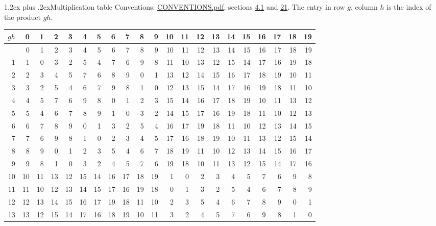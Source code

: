 \documentclass[10pt,a4paper]{article}
\makeatletter
\renewcommand\section{\@startsection{section}{1}{\z@}{-3ex plus -1ex minus -.2ex}%
  {1.2ex plus .2ex}{\normalfont\large\sffamily\bfseries\color{parttitle}}}
\numberwithin{equation}{section}
\makeatother
\begin{document}
\section{Multiplication table}\label{s:multiplication}
Conventions: \href{../../CONVENTIONS.pdf}{CONVENTIONS.pdf}, sections \href{../../../rotation/CONVENTIONS.pdf\#conv.4.1}{4.1} and \href{../../CONVENTIONS.pdf\#conv.21}{21}.
The entry in row $g$, column $h$ is the index of the product $gh$.
{\normalsize\setlength{\tabcolsep}{0.1em}\setlength{\LTleft}{-8pt plus 1fill}\setlength{\LTright}{-8pt plus 1fill}\begin{longtable}{@{}r|rrrrrrrrrrrrrrrrrrrr@{}}\toprule
$gh$ & 0 & 1 & 2 & 3 & 4 & 5 & 6 & 7 & 8 & 9 & 10 & 11 & 12 & 13 & 14 & 15 & 16 & 17 & 18 & 19\\\midrule\endhead
\bottomrule\endfoot\endlastfoot
0 & 0 & 1 & 2 & 3 & 4 & 5 & 6 & 7 & 8 & 9 & 10 & 11 & 12 & 13 & 14 & 15 & 16 & 17 & 18 & 19\\*
1 & 1 & 0 & 3 & 2 & 5 & 4 & 7 & 6 & 9 & 8 & 11 & 10 & 13 & 12 & 15 & 14 & 17 & 16 & 19 & 18\\
2 & 2 & 3 & 4 & 5 & 7 & 6 & 8 & 9 & 0 & 1 & 13 & 12 & 14 & 15 & 16 & 17 & 18 & 19 & 10 & 11\\
3 & 3 & 2 & 5 & 4 & 6 & 7 & 9 & 8 & 1 & 0 & 12 & 13 & 15 & 14 & 17 & 16 & 19 & 18 & 11 & 10\\
4 & 4 & 5 & 7 & 6 & 9 & 8 & 0 & 1 & 2 & 3 & 15 & 14 & 16 & 17 & 18 & 19 & 10 & 11 & 13 & 12\\
5 & 5 & 4 & 6 & 7 & 8 & 9 & 1 & 0 & 3 & 2 & 14 & 15 & 17 & 16 & 19 & 18 & 11 & 10 & 12 & 13\\
6 & 6 & 7 & 8 & 9 & 0 & 1 & 3 & 2 & 5 & 4 & 16 & 17 & 19 & 18 & 11 & 10 & 12 & 13 & 14 & 15\\
7 & 7 & 6 & 9 & 8 & 1 & 0 & 2 & 3 & 4 & 5 & 17 & 16 & 18 & 19 & 10 & 11 & 13 & 12 & 15 & 14\\
8 & 8 & 9 & 0 & 1 & 2 & 3 & 5 & 4 & 6 & 7 & 18 & 19 & 11 & 10 & 12 & 13 & 14 & 15 & 16 & 17\\
9 & 9 & 8 & 1 & 0 & 3 & 2 & 4 & 5 & 7 & 6 & 19 & 18 & 10 & 11 & 13 & 12 & 15 & 14 & 17 & 16\\
10 & 10 & 11 & 13 & 12 & 15 & 14 & 16 & 17 & 18 & 19 & 1 & 0 & 2 & 3 & 4 & 5 & 7 & 6 & 9 & 8\\
11 & 11 & 10 & 12 & 13 & 14 & 15 & 17 & 16 & 19 & 18 & 0 & 1 & 3 & 2 & 5 & 4 & 6 & 7 & 8 & 9\\
12 & 12 & 13 & 14 & 15 & 16 & 17 & 19 & 18 & 11 & 10 & 2 & 3 & 5 & 4 & 6 & 7 & 8 & 9 & 0 & 1\\
13 & 13 & 12 & 15 & 14 & 17 & 16 & 18 & 19 & 10 & 11 & 3 & 2 & 4 & 5 & 7 & 6 & 9 & 8 & 1 & 0\\

\end{longtable}}
\end{document}
